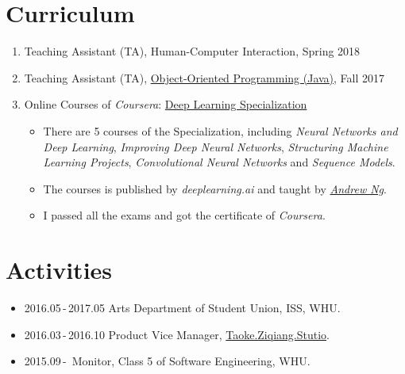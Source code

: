 \documentclass[letterpaper]{twentysecondcv} %
\begin{document}

\section{Curriculum}

\begin{enumerate}
	\item Teaching Assistant (TA), Human-Computer Interaction, Spring 2018
	\item Teaching Assistant (TA), \href{http://www.javatree.cn/}{Object-Oriented Programming (Java)}, Fall 2017
	\item Online Courses of \emph{Coursera}: \href{https://www.coursera.org/specializations/deep-learning}{Deep Learning Specialization}
		\begin{itemize}
			\item There are 5 courses of the Specialization, including
			\emph{Neural Networks and Deep Learning}, 
			\emph{Improving Deep Neural Networks}, 
			\emph{Structuring Machine Learning Projects}, 
			\emph{Convolutional Neural Networks} and 
			\emph{Sequence Models}.
			\item The courses is published by \emph{deeplearning.ai} and taught by \href{https://www.coursera.org/instructor/andrewng}{\emph{Andrew Ng}}.
			\item I passed all the exams and got the certificate of \emph{Coursera}.
		\end{itemize}
\end{enumerate}


\section{Activities}

\begin{itemize}
	\item 2016.05\,-\,2017.05 \qquad Arts Department of Student Union, ISS, WHU.
	\item 2016.03\,-\,2016.10 \qquad Product Vice Manager, \href{https://taoke.ziqiang.net.cn/}{Taoke.Ziqiang.Stutio}.
	\item 2015.09\,-\, \qquad \qquad \qquad Monitor, Class 5 of Software Engineering, WHU.
\end{itemize}
\end{document}
